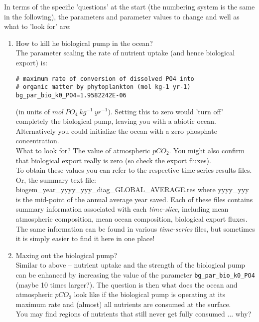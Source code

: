 \newpage
%
\noindent In terms of the specific 'questions' at the start (the numbering system is the same in the following), the parameters and parameter values to change and well as what to 'look for' are:
\vspace{1mm}

\begin{enumerate}[noitemsep]

\vspace{1mm}
\item How to kill he biological pump in the ocean?
\\The parameter scaling the rate of nutrient uptake (and hence biological export) is:
\vspace{-1mm}\small\begin{verbatim}
# maximum rate of conversion of dissolved PO4 into 
# organic matter by phytoplankton (mol kg-1 yr-1)
bg_par_bio_k0_PO4=1.9582242E-06
\end{verbatim}\normalsize\vspace{-1mm}
(in units of \(mol\:PO_{4} \:kg^{-1} \:yr^{-1}\)). Setting this to zero would 'turn off' completely the biological pump, leaving you with a abiotic ocean. Alternatively you could initialize the ocean with a zero phosphate concentration.
\vspace{1mm}
\\What to look for? The value of atmospheric \(pCO_{2}\). You might also confirm that biological export really is zero (so check the export fluxes).
\vspace{1mm}
\\To obtain these values you can refer to the respective time-series results files. Or,  the summary text file: \textsf{\footnotesize biogem\_year\_yyyy\_yyy\_diag\_GLOBAL\_AVERAGE.res}
where \textsf{\footnotesize yyyy\_yyy} is the mid-point of the annual average year saved. Each of these files contains summary information associated with  each \textit{time-slice}, including mean atmospheric composition, mean ocean composition, biological export fluxes. The same information can be found in various \textit{time-series} files, but sometimes it is simply easier to find it here in one place!

\vspace{1mm}
\item Maxing out the biological pump?
\\Similar to above -- nutrient uptake and the strength of the biological pump can be enhanced by increasing the value of the parameter \texttt{bg\_par\_bio\_k0\_PO4} (maybe 10 times larger?).
The question is then what does the ocean and atmospheric \(pCO_{2}\) look like if the biological pump is operating at its maximum rate and (almost) all nutrients are consumed at the surface.
\\You may find regions of nutrients that still never get fully consumed ... why?


\end{enumerate}
